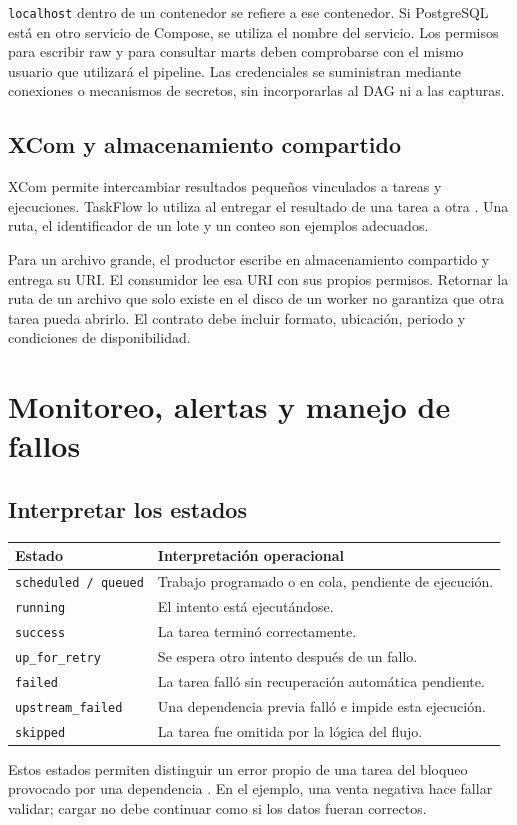 \documentclass[12pt]{article}
\begin{document}
\texttt{localhost} dentro de un contenedor se refiere a ese contenedor. Si PostgreSQL está en otro servicio de Compose, se utiliza el nombre del servicio. Los permisos para escribir raw y para consultar marts deben comprobarse con el mismo usuario que utilizará el pipeline. Las credenciales se suministran mediante conexiones o mecanismos de secretos, sin incorporarlas al DAG ni a las capturas.

\subsection{XCom y almacenamiento compartido}
XCom permite intercambiar resultados pequeños vinculados a tareas y ejecuciones. TaskFlow lo utiliza al entregar el resultado de una tarea a otra \cite{airflow_xcom,airflow_taskflow}. Una ruta, el identificador de un lote y un conteo son ejemplos adecuados.

Para un archivo grande, el productor escribe en almacenamiento compartido y entrega su URI. El consumidor lee esa URI con sus propios permisos. Retornar la ruta de un archivo que solo existe en el disco de un worker no garantiza que otra tarea pueda abrirlo. El contrato debe incluir formato, ubicación, periodo y condiciones de disponibilidad.

\section{Monitoreo, alertas y manejo de fallos}
\subsection{Interpretar los estados}
\begin{longtable}{@{}p{}p{}@{}}
\toprule
\textbf{Estado} & \textbf{Interpretación operacional} \\
\midrule
\texttt{scheduled / queued} & Trabajo programado o en cola, pendiente de ejecución. \\
\texttt{running} & El intento está ejecutándose. \\
\texttt{success} & La tarea terminó correctamente. \\
\texttt{up\_for\_retry} & Se espera otro intento después de un fallo. \\
\texttt{failed} & La tarea falló sin recuperación automática pendiente. \\
\texttt{upstream\_failed} & Una dependencia previa falló e impide esta ejecución. \\
\texttt{skipped} & La tarea fue omitida por la lógica del flujo. \\
\bottomrule
\end{longtable}
Estos estados permiten distinguir un error propio de una tarea del bloqueo provocado por una dependencia \cite{airflow_tasks}. En el ejemplo, una venta negativa hace fallar validar; cargar no debe continuar como si los datos fueran correctos.
\end{document}
